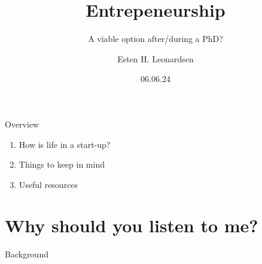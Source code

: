 \documentclass[10pt]{beamer}
\title{Entrepeneurship}
\subtitle{A viable option after/during a PhD?}
\author{Esten H. Leonardsen}
\date{06.06.24}
\begin{document}
	\begin{frame}
	 	\titlepage
	\end{frame}

    \begin{frame}{Overview}
        \begin{enumerate}
            \item How is life in a start-up?
            \item Things to keep in mind
            \item Useful resources
        \end{enumerate}
    \end{frame}

    \section{Why should you listen to me?}

    \begin{frame}{Background}
        \centering
    \end{frame}
\end{document}
